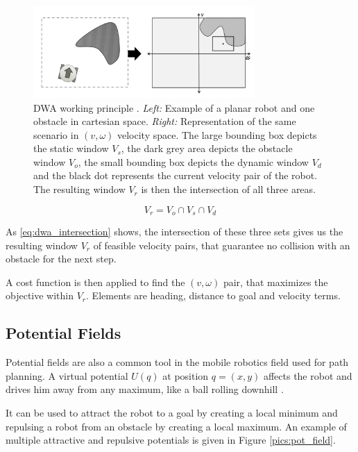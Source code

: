 \begin{figure}[h]
   \centering
   \includegraphics[width=0.75\textwidth]{images/dwa.png}
   \caption{DWA working principle \citep{siegwart2004autonomous}. \emph{Left:} Example of a planar robot and one obstacle in cartesian space. \emph{Right:} Representation of the same scenario in $(v,\omega)$ velocity space. The large bounding box depicts the static window $V_s$, the dark grey area depicts the obstacle window $V_o$, the small bounding box depicts the dynamic window $V_d$ and the black dot represents the current velocity pair of the robot. The resulting window $V_r$ is then the intersection of all three areas.}
   \label{pics:dwa}
\end{figure}

\begin{equation}
V_r = V_o \cap V_s \cap V_d
 	\label{eq:dwa_intersection}
\end{equation}

As \cref{eq:dwa_intersection} shows, the intersection of these three sets gives us the resulting window $V_r$ of feasible velocity pairs, that guarantee no collision with an obstacle for the next step.

A cost function is then applied to find the $(v,\omega)$ pair, that maximizes the objective within $V_r$. Elements are heading, distance to goal and velocity terms.

\subsection{Potential Fields}
	\label{sec:pot_field}
Potential fields are also a common tool in the mobile robotics field used for path planning. A virtual potential $U(q)$ at position $q = (x,y)$ affects the robot and drives him away from any maximum, like a ball rolling downhill \citep{siegwart2004autonomous}.

It can be used to attract the robot to a goal by creating a local minimum and repulsing a robot from an obstacle by creating a local maximum. An example of multiple attractive and repulsive potentials is given in Figure \ref{pics:pot_field}.

